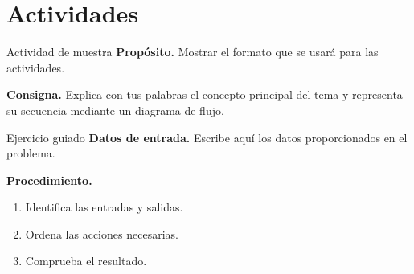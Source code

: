 \section{Actividades}

\begin{actividad}{Actividad de muestra}
  \textbf{Propósito.} Mostrar el formato que se usará para las actividades.\par
  \medskip

  \textbf{Consigna.} Explica con tus palabras el concepto principal del tema
  y representa su secuencia mediante un diagrama de flujo.

  \espaciorespuesta[4cm]
\end{actividad}

\newpage
\thispagestyle{fancy}
\begin{actividad}{Ejercicio guiado}
  \thispagestyle{fancy}
  \textbf{Datos de entrada.} Escribe aquí los datos proporcionados en el
  problema.\par
  \medskip

  \textbf{Procedimiento.}
  \begin{enumerate}[leftmargin=*]
    \item Identifica las entradas y salidas.
    \item Ordena las acciones necesarias.
    \item Comprueba el resultado.
  \end{enumerate}

  \espaciorespuesta[3.5cm]
\end{actividad}
